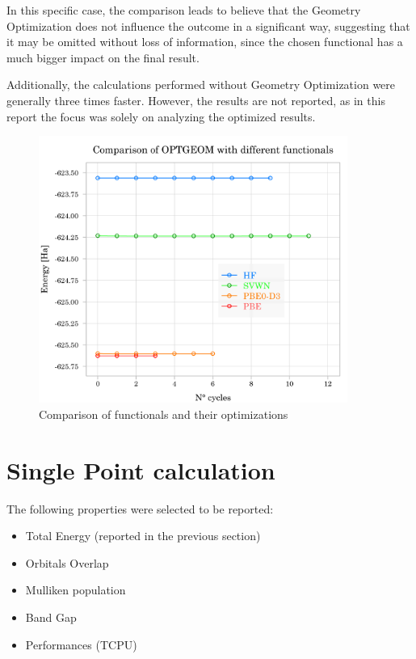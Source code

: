 \documentclass{article}
\begin{document}
In this specific case, the comparison leads to believe that the Geometry Optimization does not influence the outcome in a significant way, suggesting that it may be omitted without loss of information, since the chosen functional has a much bigger impact on the final result.

\vspace{15pt}

\noindent Additionally, the calculations performed without Geometry Optimization were generally three times faster. However, the results are not reported, as in this report the focus was solely on analyzing the optimized results.


\begin{figure}[ht]
	\centering
	\includegraphics[width=0.9\textwidth]{../images/Comparison.png}
	\caption{Comparison of functionals and their optimizations}
	\label{fig:func_comparison}
\end{figure}

\newpage
\section{Single Point calculation}
The following properties were selected to be reported:
\begin{itemize}
	\item Total Energy (reported in the previous section)
	\item Orbitals Overlap
	\item Mulliken population
	\item Band Gap
	\item Performances (TCPU)
\end{itemize}
\end{document}
